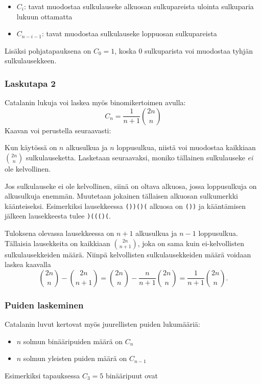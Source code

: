 \begin{itemize}
\item $C_{i}$: tavat muodostaa sulkulauseke
alkuosan sulkupareista ulointa sulkuparia lukuun ottamatta
\item $C_{n-i-1}$: tavat muodostaa sulkulauseke
loppuosan sulkupareista
\end{itemize}
Lisäksi pohjatapauksena on $C_0=1$, koska 0
sulkuparista voi muodostaa
tyhjän sulkulausekkeen.

\subsubsection{Laskutapa 2}

Catalanin lukuja voi laskea myös binomikertoimen avulla:
\[ C_n = \frac{1}{n+1} {2n \choose n}\]
Kaavan voi perustella seuraavasti:

Kun käytössä on $n$ alkusulkua ja $n$ loppusulkua,
niistä voi muodostaa kaikkiaan ${2n \choose n}$
sulkulauseketta.
Lasketaan seuraavaksi, moniko tällainen
sulkulauseke \textit{ei} ole kelvollinen.

Jos sulkulauseke ei ole kelvollinen,
siinä on oltava alkuosa,
jossa loppusulkuja on alkusulkuja enemmän.
Muutetaan jokainen tällaisen alkuosan
sulkumerkki käänteiseksi.
Esimerkiksi lausekkeessa \texttt{())()(}
alkuosa on \texttt{())} ja kääntämisen
jälkeen lausekkeesta tulee \texttt{)((()(}.

Tuloksena olevassa lausekkeessa on $n+1$ alkusulkua
ja $n-1$ loppusulkua. Tällaisia lausekkeita on
kaikkiaan ${2n \choose n+1}$,
joka on sama kuin ei-kelvollisten
sulkulausekkeiden määrä.
Niinpä kelvollisten
sulkulausekkeiden määrä voidaan laskea kaavalla
\[{2n \choose n}-{2n \choose n+1} = {2n \choose n} - \frac{n}{n+1} {2n \choose n} = \frac{1}{n+1} {2n \choose n}.\]

\subsubsection{Puiden laskeminen}

Catalanin luvut kertovat myös juurellisten
puiden lukumääriä:

\begin{itemize}
\item $n$ solmun binääripuiden määrä on $C_n$
\item $n$ solmun yleisten puiden määrä on $C_{n-1}$
\end{itemize}
\noindent
Esimerkiksi tapauksessa $C_3=5$ binääripuut ovat

